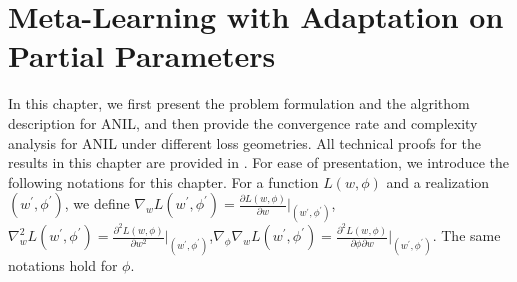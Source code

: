 \documentclass{osudissert96}
\begin{document}
\chapter{Meta-Learning with Adaptation on Partial Parameters}\label{chp:anil}
In this chapter, we first present the problem formulation and the algrithom description for ANIL, and then provide the convergence rate and complexity analysis for ANIL under different loss geometries.  All technical proofs for the results in this chapter are provided in . For ease of presentation, we introduce the following notations for this chapter. For a function {\small $L(w,\phi)$} and a realization {\small $( w^\prime, \phi^\prime)$}, we define {\small $\nabla_{w} L (w^\prime,\phi^\prime) =\frac{\partial L (w,\phi)}{\partial w}\big |_{(w^\prime, \phi^\prime)} $, $\nabla^2_{w} L( w^\prime, \phi^\prime)=\frac{\partial^2 L(w,\phi)}{\partial w^2}\big |_{(w^\prime, \phi^\prime)}$,$\nabla_\phi\nabla_w L(w^\prime, \phi^\prime) = \frac{\partial^2 L(w,\phi)}{\partial \phi \partial w}\big |_{( w^\prime, \phi^\prime)}$}. The same notations hold for $\phi$.
\end{document}
